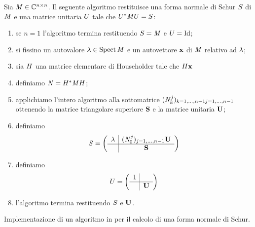 \begin{Theorem}
  Sia $\mathit{M} \in \mathbb{C}^{n \times n}$. Il seguente algoritmo restituisce una forma normale
  di Schur $S$ di $\mathit{M}$ e una matrice unitaria $U$ tale che
  ${U}^* \mathit{M} U = S$:
  \begin{enumerate}
    \item\label{Schur_1} se $n = 1$ l'algoritmo termina restituendo $S = \mathit{M}$
      e $\UnitaryMatrix = \Identity$;
    \item\label{Schur_2} si fissino un autovalore $\lambda \in \operatorname{Spect}{\mathit{M}}$ e un
      autovettore $\Eigenvector$ di $\mathit{M}$ relativo ad $\lambda$;
    \item\label{Schur_3} sia $H$ una matrice elementare di
      Householder tale che $\HouseholderElementaryMatrix \Eigenvector$
    \item\label{Schur_4} definiamo
      $\mathit{N} = {H}^* \mathit{M}
                    H$;
    \item\label{Schur_5} applichiamo l'intero algoritmo alla sottomatrice
      $(\mathit{N}_k^j)_{\substack{k = 1, ..., n - 1}{j = 1, ..., n -1}}$ ottenendo
      la matrice triangolare superiore $\mathbf{S}$ e la matrice unitaria
      $\mathbf{U}$;
    \item\label{Schur_6} definiamo
      \[
        S =
        \left (
        \begin{array}{c|c}
          \lambda & (\mathit{N}_0^j)_{j = 1, ..., n - 1} \mathbf{U}\\
          \hline
            & \mathbf{S}
        \end{array}
        \right )
      \]
    \item\label{Schur_7} definiamo
      \[
        U =
        \left (
        \begin{array}{c|c}
          1 &\\
          \hline
            & \mathbf{U}
        \end{array}
        \right )
      \]
    \item\label{Schur_8} l'algoritmo termina restituendo $S$ e
      $\mathbf{U}$.
  \end{enumerate}
\end{Theorem}
\begin{listing}
	\caption{Implementazione di un algoritmo in  per il calcolo di una
  forma normale di Schur.}
\end{listing}
